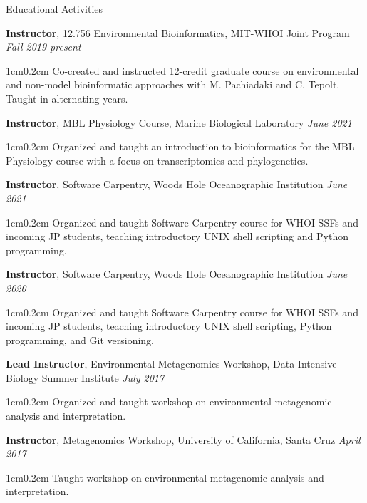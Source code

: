\documentclass{resume}
\newenvironment{tabbed}{\vspace{-20pt}\begin{adjustwidth}{1cm}{0.2cm}}{\end{adjustwidth}}
\begin{document}
  
\begin{rSection}{Educational Activities}
    
    {\textbf{Instructor}, 12.756 Environmental Bioinformatics, MIT-WHOI Joint Program} \hfill {\em Fall 2019-present} \\
    \begin{tabbed}
         {Co-created and instructed 12-credit graduate course on environmental and non-model bioinformatic approaches with M. Pachiadaki and C. Tepolt. Taught in alternating years.}  
    \end{tabbed}


   {\textbf{Instructor}, MBL Physiology Course, Marine Biological Laboratory} \hfill {\em June 2021} \\
    \begin{tabbed}
         {Organized and taught an introduction to bioinformatics for the MBL Physiology course with a focus on transcriptomics and phylogenetics.}  
    \end{tabbed}

    {\textbf{Instructor}, Software Carpentry, Woods Hole Oceanographic Institution} \hfill {\em June 2021} \\
    \begin{tabbed}
         {Organized and taught Software Carpentry course for WHOI SSFs and incoming JP students, teaching introductory UNIX shell scripting and Python programming.}  
    \end{tabbed}

    {\textbf{Instructor}, Software Carpentry, Woods Hole Oceanographic Institution} \hfill {\em June 2020} \\
    \begin{tabbed}
         {Organized and taught Software Carpentry course for WHOI SSFs and incoming JP students, teaching introductory UNIX shell scripting, Python programming, and Git versioning.}  
    \end{tabbed}

    {\textbf{Lead Instructor}, Environmental Metagenomics Workshop, Data Intensive Biology Summer Institute } \hfill {\em July 2017} \\
    \begin{tabbed}
         {Organized and taught workshop on environmental metagenomic analysis and interpretation.}  
    \end{tabbed}

    {\textbf{Instructor}, Metagenomics Workshop, University of California, Santa Cruz } \hfill {\em April 2017} \\
    \begin{tabbed}
         {Taught workshop on environmental metagenomic analysis and interpretation.}  
    \end{tabbed}


\end{rSection}
\end{document}
